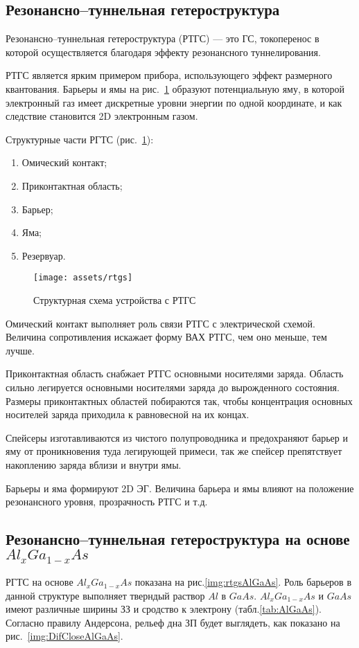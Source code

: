 \subsection{Резонансно--туннельная гетероструктура}
Резонансно--туннельная гетероструктура (РТГС) --- это ГС, токоперенос в которой осуществляется благодаря эффекту резонансного туннелирования.

РТГС является ярким примером прибора, использующего эффект размерного квантования. Барьеры и ямы на рис.~\ref{img:rtgs} образуют потенциальную яму, в которой электронный газ имеет дискретные уровни энергии по одной координате, и как следствие становится 2D электронным газом.

Структурные части РГТС (рис.~\ref{img:rtgs}):
\begin{enumerate}
  \item Омический контакт;
  \item Приконтактная область;
  \item Барьер;
  \item Яма;
  \item Резервуар.
\end{enumerate}

\begin{figure}[h]
  \centering
  \texttt{[image: assets/rtgs]}
  \caption{Структурная схема устройства с РТГС}
  \label{img:rtgs}
\end{figure}

Омический контакт выполняет роль связи РТГС с электрической схемой. Величина сопротивления искажает форму ВАХ РТГС, чем оно меньше, тем лучше.

Приконтактная область снабжает РТГС основными носителями заряда. Область сильно легируется основными носителями заряда до вырожденного состояния. Размеры приконтактных областей побираются так, чтобы концентрация основных носителей заряда приходила к равновесной на их концах.

Спейсеры изготавливаются из чистого полупроводника и предохраняют барьер и яму от проникновения туда легирующей примеси, так же спейсер препятствует накоплению заряда вблизи и внутри ямы.

Барьеры и яма формируют 2D ЭГ. Величина барьера и ямы влияют на положение резонансного уровня, прозрачность РТГС и т.д.

\subsection{Резонансно--туннельная гетероструктура на основе $Al_{x}Ga_{1-x}As$}
РГТС на основе $Al_{x}Ga_{1-x}As$ показана на рис.\ref{img:rtgsAlGaAs}. Роль барьеров в данной структуре выполняет тверндый раствор $Al$ в $GaAs$. $Al_{x}Ga_{1-x}As$ и $GaAs$ имеют различные ширины ЗЗ и сродство к электрону (табл.\ref{tab:AlGaAs}). Согласно правилу Андерсона, рельеф дна ЗП будет выглядеть, как показано на рис.~\ref{img:DifCloseAlGaAs}.

